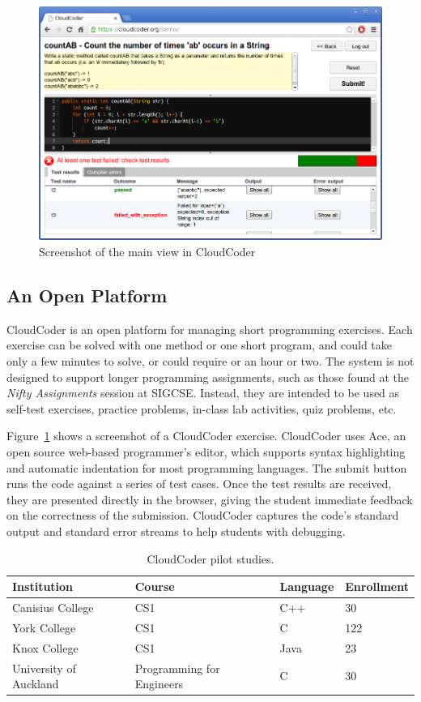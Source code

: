 \documentclass{sig-alternate}
\begin{document}
\begin{figure}
\centering
\includegraphics[width=5.5in]{images/screenshot4}
\caption{Screenshot of the main view in CloudCoder}
\label{screenshot}
\end{figure}


\subsection{An Open Platform}

CloudCoder is an open platform for managing short programming
exercises.
Each exercise can be solved with one method or one short
program, and could take only a few minutes to solve, or could require
or an hour or two.  The system is not designed to support longer
programming assignments, such as those found at the {\em Nifty
Assignments} session at SIGCSE\cite{Parlante:2013:NA:2445196.2445356}.
Instead, they are intended to be used as self-test exercises,
practice problems, in-class lab activities, quiz problems, etc.

Figure~\ref{screenshot} shows a screenshot of a CloudCoder exercise.
CloudCoder uses Ace\cite{ace}, an open source web-based
programmer's editor, which supports
syntax highlighting and automatic indentation for most programming languages.
The submit button runs the code against a series of
test cases. Once the test results are received, they are presented
directly in the browser, giving the student immediate feedback on the
correctness of the submission.
CloudCoder captures the code's standard output and
standard error streams to help students with debugging.

\begin{table}
\centering
\begin{tabular}{llll}
\toprule
Institution & Course & Language & Enrollment\\
\midrule
Canisius College & CS1 & C++ & 30\\
York College & CS1 & C & 122\\
Knox College & CS1 & Java & 23\\
University of Auckland & Programming for Engineers & C & 30\\
\bottomrule
\end{tabular}
\caption{CloudCoder pilot studies.}
\label{tab:courses}
\end{table}
\end{document}
